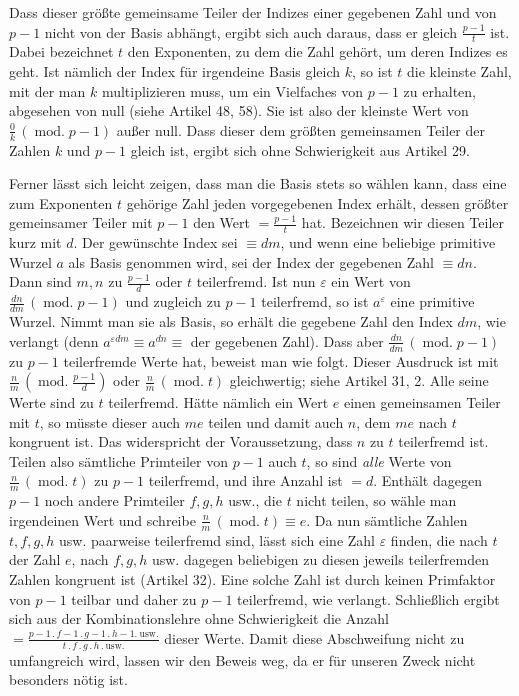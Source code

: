 Dass dieser größte gemeinsame Teiler der Indizes einer gegebenen Zahl und von $p-1$ nicht von der Basis abhängt, ergibt sich auch daraus, dass er gleich $\frac{p-1}{t}$ ist. Dabei bezeichnet $t$ den Exponenten, zu dem die Zahl gehört, um deren Indizes es geht. Ist nämlich der Index für irgendeine Basis gleich $k$, so ist $t$ die kleinste Zahl, mit der man $k$ multiplizieren muss, um ein Vielfaches von $p-1$ zu erhalten, abgesehen von null (siehe Artikel 48, 58). Sie ist also der kleinste Wert von $\frac{0}{k}\,(\operatorname{mod.}p-1)$ außer null. Dass dieser dem größten gemeinsamen Teiler der Zahlen $k$ und $p-1$ gleich ist, ergibt sich ohne Schwierigkeit aus Artikel 29.

Ferner lässt sich leicht zeigen, dass man die Basis stets so wählen kann, dass eine zum Exponenten $t$ gehörige Zahl jeden vorgegebenen Index erhält, dessen größter gemeinsamer Teiler mit $p-1$ den Wert $=\frac{p-1}{t}$ hat. Bezeichnen wir diesen Teiler kurz mit $d$. Der gewünschte Index sei $\equiv dm$, und wenn eine beliebige
primitive Wurzel $a$ als Basis genommen wird, sei der Index der gegebenen Zahl $\equiv dn$. Dann sind $m,n$ zu $\frac{p-1}{d}$ oder $t$ teilerfremd. Ist nun $\varepsilon$ ein Wert von $\frac{dn}{dm}\,(\operatorname{mod.}p-1)$ und zugleich zu $p-1$ teilerfremd, so ist $a^\varepsilon$ eine primitive Wurzel. Nimmt man sie als Basis, so erhält die gegebene Zahl den Index $dm$, wie verlangt (denn $a^{\varepsilon dm}\equiv a^{dn}\equiv$ der gegebenen Zahl). Dass aber $\frac{dn}{dm}\,(\operatorname{mod.}p-1)$ zu $p-1$ teilerfremde Werte hat, beweist man wie folgt. Dieser Ausdruck ist mit $\frac{n}{m}\,(\operatorname{mod.}\frac{p-1}{d})$ oder $\frac{n}{m}\,(\operatorname{mod.}t)$ gleichwertig; siehe Artikel 31, 2. Alle seine Werte sind zu $t$ teilerfremd. Hätte nämlich ein Wert $e$ einen gemeinsamen Teiler mit $t$, so müsste dieser auch $me$ teilen und damit auch $n$, dem $me$ nach $t$ kongruent ist. Das widerspricht der Voraussetzung, dass $n$ zu $t$ teilerfremd ist. Teilen also sämtliche Primteiler von $p-1$ auch $t$, so sind \emph{alle} Werte von $\frac{n}{m}\,(\operatorname{mod.}t)$ zu $p-1$ teilerfremd, und ihre Anzahl ist $=d$. Enthält dagegen $p-1$ noch andere Primteiler $f,g,h$ usw., die $t$ nicht teilen, so wähle man irgendeinen Wert und schreibe $\frac{n}{m}\,(\operatorname{mod.}t)\equiv e$. Da nun sämtliche Zahlen $t,f,g,h$ usw. paarweise teilerfremd sind, lässt sich eine Zahl $\varepsilon$ finden, die nach $t$ der Zahl $e$, nach $f,g,h$ usw. dagegen beliebigen zu diesen jeweils teilerfremden Zahlen kongruent ist (Artikel 32). Eine solche Zahl ist durch keinen Primfaktor von $p-1$ teilbar und daher zu $p-1$ teilerfremd, wie verlangt. Schließlich ergibt sich aus der Kombinationslehre ohne Schwierigkeit die Anzahl $=\frac{p-1\,.\,f-1\,.\,g-1\,.\,h-1.\ \mathrm{usw.}}{t\,.\,f\,.\,g\,.\,h\,.\,\mathrm{usw.}}$ dieser Werte. Damit diese Abschweifung nicht zu umfangreich wird, lassen wir den Beweis weg, da er für unseren Zweck nicht besonders nötig ist.

